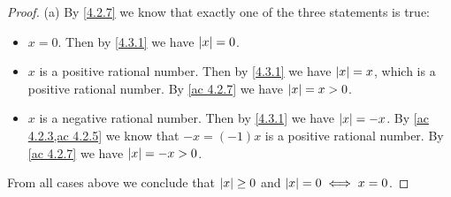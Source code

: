 \begin{proof}{(a)}
  By \cref{4.2.7} we know that exactly one of the three statements is true:
  \begin{itemize}
    \item \(x = 0\).
          Then by \cref{4.3.1} we have \(\left\lvert x\right\rvert = 0\).
    \item \(x\) is a positive rational number.
          Then by \cref{4.3.1} we have \(\left\lvert x\right\rvert = x\), which is a positive rational number.
          By \cref{ac 4.2.7} we have \(\left\lvert x\right\rvert = x > 0\).
    \item \(x\) is a negative rational number.
          Then by \cref{4.3.1} we have \(\left\lvert x\right\rvert = -x\).
          By \cref{ac 4.2.3,ac 4.2.5} we know that \(-x = (-1)x\) is a positive rational number.
          By \cref{ac 4.2.7} we have \(\left\lvert x\right\rvert = -x > 0\).
  \end{itemize}
  From all cases above we conclude that \(\left\lvert x\right\rvert \geq 0\) and \(\left\lvert x\right\rvert = 0 \iff x = 0\).
\end{proof}

